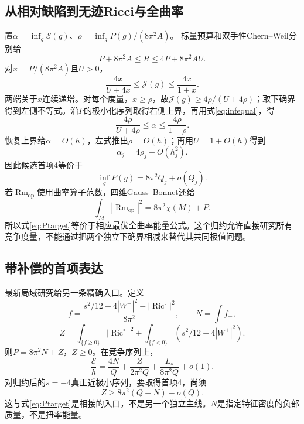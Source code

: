 \documentclass[UTF8,fontset=fandol,zihao=-4,a4paper]{ctexart}
\theoremstyle{remark}
\DeclareMathOperator{\Ric}{Ric}
\DeclareMathOperator{\Rm}{Rm}
\newcommand{\E}{\mathcal E}
\newcommand{\J}{\mathcal J}
\begin{document}
\subsection{从相对缺陷到无迹Ricci与全曲率}

置$\alpha=\inf_g\E(g)$、$\rho=\inf_gP(g)/(8\pi^2A)$。
标量预算和双手性Chern--Weil分别给
\begin{equation}
P+8\pi^2A\le R\le4P+8\pi^2AU.
\label{eq:Rbounds}
\end{equation}
对$x=P/(8\pi^2A)$且$U>0$，
\[
\frac{4x}{U+4x}\le\J(g)\le\frac{4x}{1+x}.
\]
两端关于$x$连续递增。对每个度量，$x\ge\rho$，故$\J(g)\ge4\rho/(U+4\rho)$；取下确界得到左侧不等式。沿$P$的极小化序列取得右侧上界，再用式\eqref{eq:infequal}，得
\begin{equation}
\frac{4\rho}{U+4\rho}\le\alpha\le\frac{4\rho}{1+\rho}.
\label{eq:rhobounds}
\end{equation}
恢复上界给$\alpha=O(h)$，左式推出$\rho=O(h)$；再用$U=1+O(h)$得到
\begin{equation}
\boxed{\alpha_j=4\rho_j+O(h_j^2).}
\label{eq:rhoreduction}
\end{equation}
因此候选首项4等价于
\begin{equation}
\inf_gP(g)=8\pi^2Q_j+o(Q_j).
\label{eq:Ptarget}
\end{equation}
若$\Rm_{\mathrm{op}}$使用曲率算子范数，四维Gauss--Bonnet还给
\[
\int_M|\Rm_{\mathrm{op}}|^2=8\pi^2\chi(M)+P.
\]
所以式\eqref{eq:Ptarget}等价于相应最优全曲率能量公式。这个归约允许直接研究所有竞争度量，不能通过把两个独立下确界相减来替代其共同极值问题。

\subsection{带补偿的首项表达}

最新局域研究给另一条精确入口。定义
\[
f=\frac{s^2/12+4|W^+|^2-|\Ric^\circ|^2}{8\pi^2},
\qquad N=\int f_-,
\]
\[
Z=\int_{\{f\ge0\}}|\Ric^\circ|^2
+\int_{\{f<0\}}\left(s^2/12+4|W^+|^2\right).
\]
则$P=8\pi^2N+Z$，$Z\ge0$。在竞争序列上，
\begin{equation}
\frac{\E}{h}=\frac{4N}{Q}+\frac{Z}{2\pi^2Q}
+\frac{L_s}{8\pi^2Q}+o(1).
\label{eq:compensate}
\end{equation}
对归约后的$s=-4$真正近极小序列，要取得首项4，尚须
\begin{equation}
Z\ge8\pi^2(Q-N)-o(Q).
\label{eq:Ztarget}
\end{equation}
这与式\eqref{eq:Ptarget}是相接的入口，不是另一个独立主线。$N$是指定特征密度的负部质量，不是扭率能量。
\end{document}
